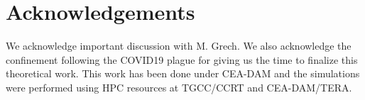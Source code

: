 \documentclass[
 reprint,
 amsmath,amssymb,
 aps,
]{revtex4-1}
\begin{document}
\section*{Acknowledgements}
We acknowledge important discussion with M. Grech.  We also acknowledge the confinement following the COVID19 plague for giving us the time to finalize this theoretical work. 
This work has been done under CEA-DAM and
the simulations were performed using HPC resources at TGCC/CCRT and CEA-DAM/TERA.

\end{document}
